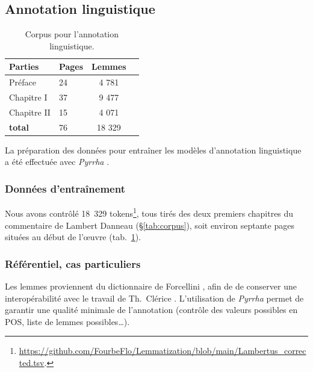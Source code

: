 \documentclass[final, fra]{anthology-ch}      %
\begin{document}
\subsection{Annotation linguistique}
\label{sec:Lemmatisation}
\begin{table}
    \centering\small\vspace{-.4cm}
    \begin{tabular}{l l c c}
        \toprule
        \textbf{Parties} & \textbf{Pages} & \textbf{Lemmes} \\
        \midrule
        Préface & 24 & 4 781 \\
        Chapitre I & 37 & 9 477 \\
        Chapitre II & 15 & 4 071 \\
        \toprule
        \textbf{total} & 76 & 18 329 \\
        \bottomrule
    \end{tabular}
    \caption{Corpus pour l'annotation linguistique.}
    \label{tab:annotation}
    \vspace{-1cm}
\end{table}
La préparation des données pour entraîner les modèles d'annotation linguistique a été effectuée avec \textit{Pyrrha} \cite{clerice_building_2022}.

\subsubsection{Données d'entraînement}
Nous avons contrôlé 18~329 tokens\footnote{\url{https://github.com/FourbeFlo/Lemmatization/blob/main/Lambertus_corrected.tsv}.}, tous tirés des deux premiers chapitres du commentaire de Lambert Danneau (\S\ref{tab:corpus}), soit environ septante pages situées au début de l'œuvre (tab.~\ref{tab:annotation}). 

\subsubsection{Référentiel, cas particuliers}
Les lemmes proviennent du dictionnaire de Forcellini \cite{forcellini1940}, afin de de conserver une interopérabilité avec le travail de Th.~Clérice \cite{cléri2022}. L'utilisation de \textit{Pyrrha} permet de garantir une qualité minimale de l'annotation (contrôle des valeurs possibles en POS, liste de lemmes possibles…). 
\end{document}
